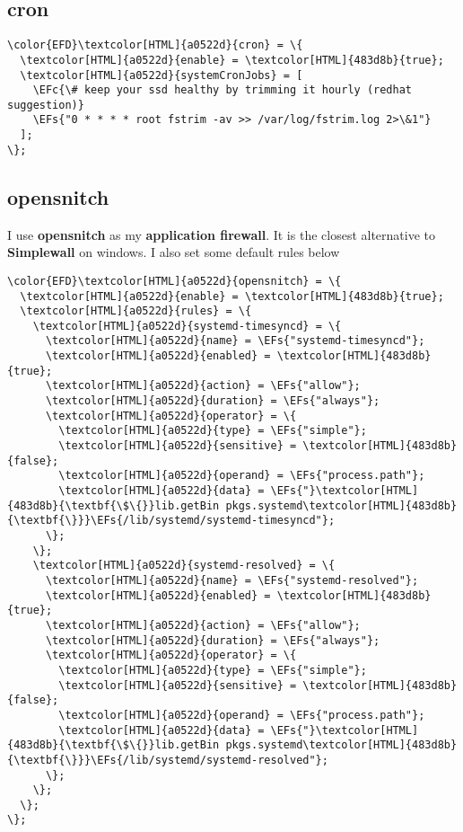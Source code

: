 \documentclass[14pt]{article}
\newcommand{\EFc}[1]{\textcolor{EFc}{#1}} %
\newcommand{\EFs}[1]{\textcolor{EFs}{#1}} %
\begin{document}
\subsection{cron}
\label{sec:orge4e4fa0}
\begin{Code}
\begin{Verbatim}
\color{EFD}\textcolor[HTML]{a0522d}{cron} = \{
  \textcolor[HTML]{a0522d}{enable} = \textcolor[HTML]{483d8b}{true};
  \textcolor[HTML]{a0522d}{systemCronJobs} = [
    \EFc{\# keep your ssd healthy by trimming it hourly (redhat suggestion)}
    \EFs{"0 * * * * root fstrim -av >> /var/log/fstrim.log 2>\&1"}
  ];
\};
\end{Verbatim}
\end{Code}
\subsection{opensnitch}
\label{sec:org90307d7}
I use \textbf{opensnitch} as my \textbf{application firewall}. It is the closest alternative to \textbf{Simplewall} on windows. I also set some default rules below

\begin{Code}
\begin{Verbatim}
\color{EFD}\textcolor[HTML]{a0522d}{opensnitch} = \{
  \textcolor[HTML]{a0522d}{enable} = \textcolor[HTML]{483d8b}{true};
  \textcolor[HTML]{a0522d}{rules} = \{
    \textcolor[HTML]{a0522d}{systemd-timesyncd} = \{
      \textcolor[HTML]{a0522d}{name} = \EFs{"systemd-timesyncd"};
      \textcolor[HTML]{a0522d}{enabled} = \textcolor[HTML]{483d8b}{true};
      \textcolor[HTML]{a0522d}{action} = \EFs{"allow"};
      \textcolor[HTML]{a0522d}{duration} = \EFs{"always"};
      \textcolor[HTML]{a0522d}{operator} = \{
        \textcolor[HTML]{a0522d}{type} = \EFs{"simple"};
        \textcolor[HTML]{a0522d}{sensitive} = \textcolor[HTML]{483d8b}{false};
        \textcolor[HTML]{a0522d}{operand} = \EFs{"process.path"};
        \textcolor[HTML]{a0522d}{data} = \EFs{"}\textcolor[HTML]{483d8b}{\textbf{\$\{}}lib.getBin pkgs.systemd\textcolor[HTML]{483d8b}{\textbf{\}}}\EFs{/lib/systemd/systemd-timesyncd"};
      \};
    \};
    \textcolor[HTML]{a0522d}{systemd-resolved} = \{
      \textcolor[HTML]{a0522d}{name} = \EFs{"systemd-resolved"};
      \textcolor[HTML]{a0522d}{enabled} = \textcolor[HTML]{483d8b}{true};
      \textcolor[HTML]{a0522d}{action} = \EFs{"allow"};
      \textcolor[HTML]{a0522d}{duration} = \EFs{"always"};
      \textcolor[HTML]{a0522d}{operator} = \{
        \textcolor[HTML]{a0522d}{type} = \EFs{"simple"};
        \textcolor[HTML]{a0522d}{sensitive} = \textcolor[HTML]{483d8b}{false};
        \textcolor[HTML]{a0522d}{operand} = \EFs{"process.path"};
        \textcolor[HTML]{a0522d}{data} = \EFs{"}\textcolor[HTML]{483d8b}{\textbf{\$\{}}lib.getBin pkgs.systemd\textcolor[HTML]{483d8b}{\textbf{\}}}\EFs{/lib/systemd/systemd-resolved"};
      \};
    \};
  \};
\};
\end{Verbatim}
\end{Code}
\end{document}

